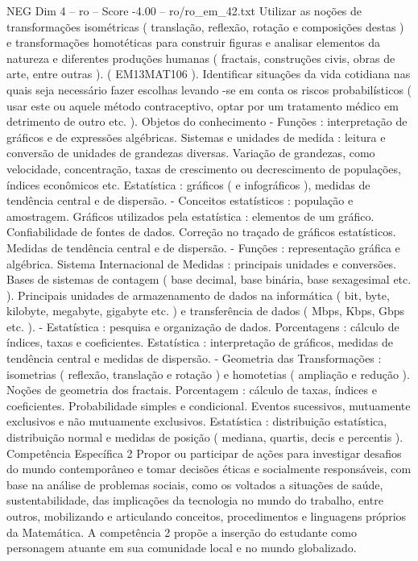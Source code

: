 \begin{textsample}{NEG Dim 4 – ro – Score -4.00 – ro/ro\_em\_42.txt}
Utilizar as noções de transformações isométricas ( translação, reflexão, rotação e composições destas ) e transformações homotéticas para construir figuras e analisar elementos da natureza e diferentes produções humanas ( fractais, construções civis, obras de arte, entre outras ). ( EM13MAT106 ).
Identificar situações da vida cotidiana nas quais seja necessário fazer escolhas levando -se em conta os riscos probabilísticos ( usar este ou aquele método contraceptivo, optar por um tratamento médico em detrimento de outro etc. ).
Objetos do conhecimento - Funções : interpretação de gráficos e de expressões algébricas.
Sistemas e unidades de medida : leitura e conversão de unidades de grandezas diversas.
Variação de grandezas, como velocidade, concentração, taxas de crescimento ou decrescimento de populações, índices econômicos etc.
Estatística : gráficos ( e infográficos ), medidas de tendência central e de dispersão. - Conceitos estatísticos : população e amostragem.
Gráficos utilizados pela estatística : elementos de um gráfico.
Confiabilidade de fontes de dados.
Correção no traçado de gráficos estatísticos.
Medidas de tendência central e de dispersão. - Funções : representação gráfica e algébrica.
Sistema Internacional de Medidas : principais unidades e conversões.
Bases de sistemas de contagem ( base decimal, base binária, base sexagesimal etc. ).
Principais unidades de armazenamento de dados na informática ( bit, byte, kilobyte, megabyte, gigabyte etc. ) e transferência de dados ( Mbps, Kbps, Gbps etc. ). - Estatística : pesquisa e organização de dados.
Porcentagens : cálculo de índices, taxas e coeficientes.
Estatística : interpretação de gráficos, medidas de tendência central e medidas de dispersão. - Geometria das Transformações : isometrias ( reflexão, translação e rotação ) e homotetias ( ampliação e redução ).
Noções de geometria dos fractais.
Porcentagem : cálculo de taxas, índices e coeficientes.
Probabilidade simples e condicional.
Eventos sucessivos, mutuamente exclusivos e não mutuamente exclusivos.
Estatística : distribuição estatística, distribuição normal e medidas de posição ( mediana, quartis, decis e percentis ).
Competência Específica 2 Propor ou participar de ações para investigar desafios do mundo contemporâneo e tomar decisões éticas e socialmente responsáveis, com base na análise de problemas sociais, como os voltados a situações de saúde, sustentabilidade, das implicações da tecnologia no mundo do trabalho, entre outros, mobilizando e articulando conceitos, procedimentos e linguagens próprios da Matemática.
A competência 2 propõe a inserção do estudante como personagem atuante em sua comunidade local e no mundo globalizado.

\end{textsample}
